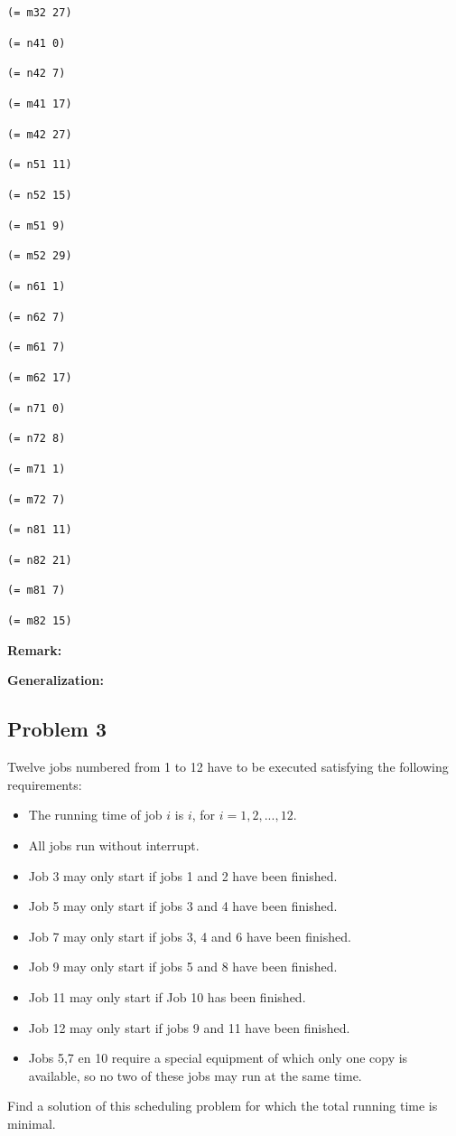 \documentclass[11pt]{article}
\begin{document}
{{{{\tt(= m32 27)}

{\tt(= n41 0)}

{\tt(= n42 7)}

{\tt(= m41 17)}

{\tt(= m42 27)}

{\tt(= n51 11)}

{\tt(= n52 15)}

{\tt(= m51 9)}

{\tt(= m52 29)}

{\tt(= n61 1)}

{\tt(= n62 7)}

{\tt(= m61 7)}

{\tt(= m62 17)}

{\tt(= n71 0)}

{\tt(= n72 8)}

{\tt(= m71 1)}

{\tt(= m72 7)}

{\tt(= n81 11)}

{\tt(= n82 21)}

{\tt(= m81 7)}

{\tt(= m82 15)}

}


\vspace{3mm}

{\bf Remark:}

\vspace{3mm}

{\bf Generalization:}

\vspace{5mm}

\subsection*{Problem 3}

Twelve jobs numbered from 1 to 12 have to be executed satisfying the following requirements:
\begin{itemize}
  \item The running time of job $i$ is $i$, for $i = 1, 2, . . . , 12$.
  \item All jobs run without interrupt.
  \item Job 3 may only start if jobs 1 and 2 have been finished.
  \item Job 5 may only start if jobs 3 and 4 have been finished.
  \item Job 7 may only start if jobs 3, 4 and 6 have been finished.
  \item Job 9 may only start if jobs 5 and 8 have been finished.
  \item Job 11 may only start if Job 10 has been finished.
  \item Job 12 may only start if jobs 9 and 11 have been finished.
  \item Jobs 5,7 en 10 require a special equipment of which only one copy is available, so no two of these jobs may run at the same time.
\end{itemize}
Find a solution of this scheduling problem for which the total running time is minimal.

}}
\end{document}

